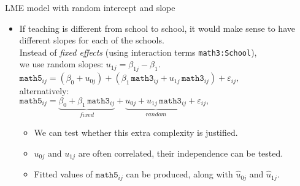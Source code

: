 \documentclass{beamer}
\begin{document}
\begin{frame}{LME model with random intercept and slope}
\begin{itemize}
\item If teaching is different from school to school, it would make
sense to have different slopes for each of the schools.\\
\medskip
Instead of \textit{fixed effects} (using interaction terms \texttt{math3:School}), \\we use random slopes: $ u_{1j} = \beta_{1j} - \beta_1 $. \\
\bigskip
$ \texttt{math5}_{ij} = \left( \beta_{0} + u_{0j} \right) + \left( \beta_1\, \texttt{math3}_{ij}  + u_{1j} \, \texttt{math3}_{ij}  \right) + \varepsilon_{ij}, $ \\
\medskip
alternatively:\\
\medskip
$\texttt{math5}_{ij} = \underbrace{\beta_{0} + \beta_1 \,  \texttt{math3}_{ij}}_{\textit{fixed}}
+ \underbrace{u_{0j} + u_{1j} \, \texttt{math3}_{ij}}_{\textit{random}} 
+ \varepsilon_{ij}, $ \\
\bigskip
\begin{itemize}
\item We can test whether this extra complexity is justified.
\smallskip
\item ${u}_{0j}$ and ${u}_{1j}$ are often correlated, their independence can be tested.
\smallskip
\item Fitted values of $\texttt{math5}_{ij}$ can be produced, along with $\hat{u}_{0j}$ and $\hat{u}_{1j}$.
\end{itemize}
\end{itemize}
\end{frame}
\end{document}

